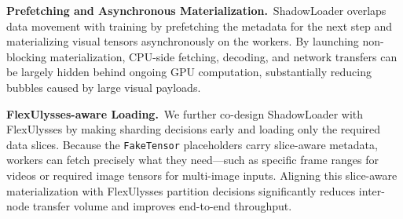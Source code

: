\noindent\textbf{Prefetching and Asynchronous Materialization.}~ShadowLoader overlaps data movement with training by prefetching the metadata for the next step and materializing visual tensors asynchronously on the workers. By launching non-blocking materialization, CPU-side fetching, decoding, and network transfers can be largely hidden behind ongoing GPU computation, substantially reducing bubbles caused by large visual payloads.

\noindent\textbf{FlexUlysses-aware Loading.}~We further co-design ShadowLoader with FlexUlysses by making sharding decisions early and loading only the required data slices. Because the \texttt{FakeTensor} placeholders carry slice-aware metadata, workers can fetch precisely what they need—such as specific frame ranges for videos or required image tensors for multi-image inputs. Aligning this slice-aware materialization with FlexUlysses partition decisions significantly reduces inter-node transfer volume and improves end-to-end throughput.
